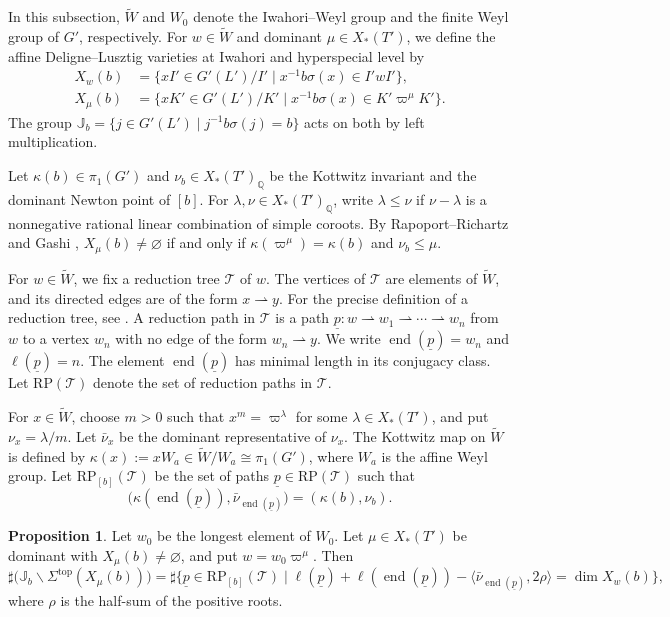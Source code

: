 \documentclass[12pt]{article}
\DeclareMathOperator{\en}{end}
\newcommand\Q{\mathbb Q}
\newcommand\J{\mathbb J}
\newcommand\tW{\tilde W}
\newcommand\tp{\mathrm{top}}
\newcommand\unp{\underline p}
\newcommand\vp{\varpi}
\theoremstyle{definition}
\newtheorem{prop}[theo]{Proposition}
\begin{document}
In this subsection, $\tW$ and $W_0$ denote the Iwahori--Weyl group and the finite Weyl group of $G'$, respectively.
For $w\in\tW$ and dominant $\mu\in X_*(T')$, we define the affine Deligne--Lusztig varieties at Iwahori and hyperspecial level by
$$
\begin{aligned}
X_w(b)&=\{xI'\in G'(L')/I'\mid x^{-1}b\sigma(x)\in I'wI'\},\\
X_\mu(b)&=\{xK'\in G'(L')/K'\mid x^{-1}b\sigma(x)\in K'\vp^\mu K'\}.
\end{aligned}
$$
The group $\J_b=\{j\in G'(L')\mid j^{-1}b\sigma(j)=b\}$ acts on both by left multiplication.

Let $\kappa(b)\in\pi_1(G')$ and $\nu_b\in X_*(T')_{\Q}$ be the Kottwitz invariant and the dominant Newton point of $[b]$.
For $\lambda,\nu\in X_*(T')_{\Q}$, write $\lambda\le\nu$ if $\nu-\lambda$ is a nonnegative rational linear combination of simple coroots.
By Rapoport--Richartz \cite[Theorem 4.2]{RR96} and Gashi \cite[Theorem 1.1]{Gashi10}, $X_\mu(b)\ne\varnothing$ if and only if $\kappa(\vp^\mu)=\kappa(b)$ and $\nu_b\le\mu$.

For $w\in\tW$, we fix a reduction tree $\mathcal T$ of $w$.
The vertices of $\mathcal T$ are elements of $\tW$, and its directed edges are of the form $x\rightharpoonup y$.
For the precise definition of a reduction tree, see \cite[\S2.2]{He25}.
A reduction path in $\mathcal T$ is a path $\unp:w\rightharpoonup w_1\rightharpoonup\cdots\rightharpoonup w_n$ from $w$ to a vertex $w_n$ with no edge of the form $w_n\rightharpoonup y$.
We write $\en(\unp)=w_n$ and $\ell(\unp)=n$.
The element $\en(\unp)$ has minimal length in its conjugacy class.
Let $\mathrm{RP}(\mathcal T)$ denote the set of reduction paths in $\mathcal T$.

For $x\in\tW$, choose $m>0$ such that $x^m=\vp^\lambda$ for some $\lambda\in X_*(T')$, and put $\nu_x=\lambda/m$.
Let $\bar\nu_x$ be the dominant representative of $\nu_x$.
The Kottwitz map on $\tW$ is defined by $\kappa(x):=xW_a\in\tW/W_a\cong\pi_1(G')$, where $W_a$ is the affine Weyl group.
Let $\mathrm{RP}_{[b]}(\mathcal T)$ be the set of paths $\unp\in\mathrm{RP}(\mathcal T)$ such that
$$
\bigl(\kappa(\en(\unp)),\bar\nu_{\en(\unp)}\bigr)=(\kappa(b),\nu_b).
$$

\begin{prop}\label{adlv-grassmannian-path-count}
Let $w_0$ be the longest element of $W_0$.
Let $\mu\in X_*(T')$ be dominant with $X_\mu(b)\ne\varnothing$, and put $w=w_0\vp^\mu$.
Then
$$
\sharp\bigl(\J_b\backslash\Sigma^{\tp}(X_\mu(b))\bigr)
=\sharp\{\unp\in\mathrm{RP}_{[b]}(\mathcal T)\mid
\ell(\unp)+\ell(\en(\unp))-\langle\bar\nu_{\en(\unp)},2\rho\rangle=\dim X_w(b)\},
$$
where $\rho$ is the half-sum of the positive roots.
\end{prop}
\end{document}
